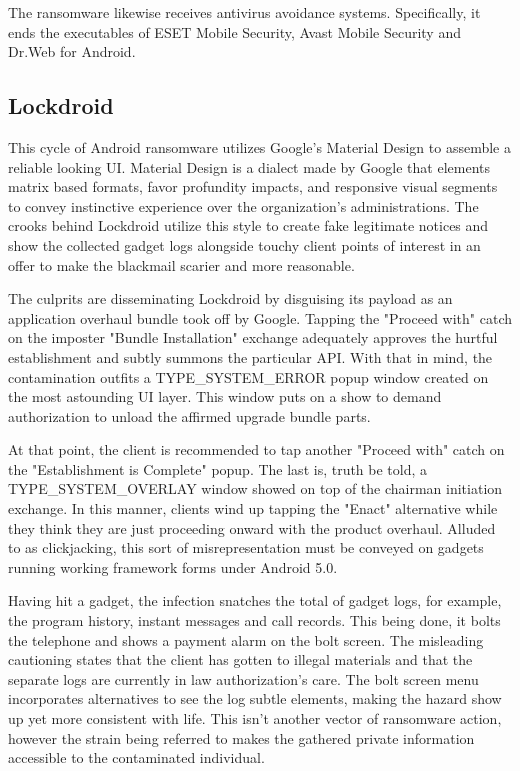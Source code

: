 The ransomware likewise receives antivirus avoidance systems. Specifically, it ends the executables of ESET Mobile Security, Avast Mobile Security and Dr.Web for Android.

\subsection{Lockdroid}

This cycle of Android ransomware utilizes Google's Material Design to assemble a reliable looking UI. Material Design is a dialect made by Google that elements matrix based formats, favor profundity impacts, and responsive visual segments to convey instinctive experience over the organization's administrations. The crooks behind Lockdroid utilize this style to create fake legitimate notices and show the collected gadget logs alongside touchy client points of interest in an offer to make the blackmail scarier and more reasonable. 

The culprits are disseminating Lockdroid by disguising its payload as an application overhaul bundle took off by Google. Tapping the "Proceed with" catch on the imposter "Bundle Installation" exchange adequately approves the hurtful establishment and subtly summons the particular API. With that in mind, the contamination outfits a TYPE\_SYSTEM\_ERROR popup window created on the most astounding UI layer. This window puts on a show to demand authorization to unload the affirmed upgrade bundle parts. 

At that point, the client is recommended to tap another "Proceed with" catch on the "Establishment is Complete" popup. The last is, truth be told, a TYPE\_SYSTEM\_OVERLAY window showed on top of the chairman initiation exchange. In this manner, clients wind up tapping the "Enact" alternative while they think they are just proceeding onward with the product overhaul. Alluded to as clickjacking, this sort of misrepresentation must be conveyed on gadgets running working framework forms under Android 5.0. 

Having hit a gadget, the infection snatches the total of gadget logs, for example, the program history, instant messages and call records. This being done, it bolts the telephone and shows a payment alarm on the bolt screen. The misleading cautioning states that the client has gotten to illegal materials and that the separate logs are currently in law authorization's care. The bolt screen menu incorporates alternatives to see the log subtle elements, making the hazard show up yet more consistent with life. This isn't another vector of ransomware action, however the strain being referred to makes the gathered private information accessible to the contaminated individual.

